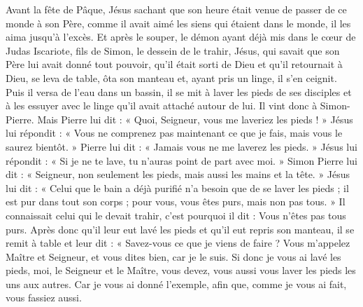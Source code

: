 Avant la fête de Pâque, Jésus sachant que son heure était venue de passer de ce monde à son Père, comme il avait aimé les siens qui étaient dans le monde, il les aima jusqu’à l’excès. Et après le souper, le démon ayant déjà mis dans le cœur de Judas Iscariote, fils de Simon, le dessein de le trahir, Jésus, qui savait que son Père lui avait donné tout pouvoir, qu’il était sorti de Dieu et qu’il retournait à Dieu, se leva de table, ôta son manteau et, ayant pris un linge, il s’en ceignit. Puis il versa de l’eau dans un bassin, il se mit à laver les pieds de ses disciples et à les essuyer avec le linge qu’il avait attaché autour de lui. Il vint donc à Simon-Pierre. Mais Pierre lui dit : « Quoi, Seigneur, vous me laveriez les pieds ! » Jésus lui répondit : « Vous ne comprenez pas maintenant ce que je fais, mais vous le saurez bientôt. » Pierre lui dit : « Jamais vous ne me laverez les pieds. » Jésus lui répondit : « Si je ne te lave, tu n’auras point de part avec moi. » Simon Pierre lui dit : « Seigneur, non seulement les pieds, mais aussi les mains et la tête. » Jésus lui dit : « Celui que le bain a déjà purifié n’a besoin que de se laver les pieds ; il est pur dans tout son corps ; pour vous, vous êtes purs, mais non pas tous. » Il connaissait celui qui le devait trahir, c’est pourquoi il dit : Vous n’êtes pas tous purs. Après donc qu’il leur eut lavé les pieds et qu’il eut repris son manteau, il se remit à table et leur dit : « Savez-vous ce que je viens de faire ? Vous m’appelez Maître et Seigneur, et vous dites bien, car je le suis. Si donc je vous ai lavé les pieds, moi, le Seigneur et le Maître, vous devez, vous aussi vous laver les pieds les uns aux autres. Car je vous ai donné l’exemple, afin que, comme je vous ai fait, vous fassiez aussi.